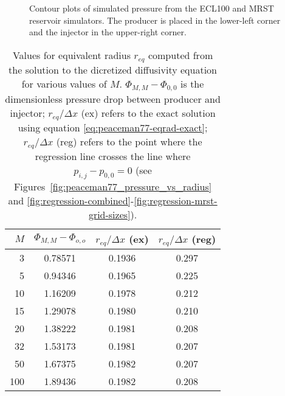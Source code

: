 \begin{figure}
    \begin{minipage}[b]{.5\linewidth}
        \centering\scalebox{.52}{}
        \label{fig:contour-ecl10}
    \end{minipage}%
    \hskip 0.5cm
    \begin{minipage}[b]{.5\linewidth}
        \centering\scalebox{.52}{}
        \label{fig:contour-mrst10}
    \end{minipage}
    \caption{Contour plots of simulated pressure from the ECL100 and MRST reservoir simulators. The producer is placed in the lower-left corner and the injector in the upper-right corner.}
    \label{fig:contours-ect10-mrst10}
\end{figure}


\begin{table}[htbp]
    \centering
    \caption{Values for equivalent radius $r_{eq}$ computed from the solution to the dicretized diffusivity equation for various values of $M$. $\Phi_{M,M} - \Phi_{0,0}$ is the dimensionless pressure drop between producer and injector; $r_{eq}/\Delta x$ (ex) refers to the exact solution using equation \eqref{eq:peaceman77-eqrad-exact}; $r_{eq} / \Delta x$ (reg) refers to the point where the regression line crosses the line where $p_{i,j}-p_{0,0}=0$ (see Figures~\ref{fig:peaceman77_pressure_vs_radius} and \ref{fig:regression-combined}-\ref{fig:regression-mrst-grid-sizes}).}
    \begin{tabular}{r|ccc}
        \toprule
        $M$ & $\Phi_{M,M} - \Phi_{o,o}$ & $r_{eq}/\Delta x$ (ex) & $r_{eq} / \Delta x$ (reg)  \\
        \midrule
        3   & 0.78571 & 0.1936 & 0.297 \\
        5   & 0.94346 & 0.1965 & 0.225 \\
        10  & 1.16209 & 0.1978 & 0.212 \\
        15  & 1.29078 & 0.1980 & 0.210 \\
        20  & 1.38222 & 0.1981 & 0.208 \\
        32  & 1.53173 & 0.1981 & 0.207 \\
        50  & 1.67375 & 0.1982 & 0.207 \\
        100 & 1.89436 & 0.1982 & 0.208 \\
        \bottomrule
    \end{tabular}
    \label{tbl:peaceman-results}
\end{table}

